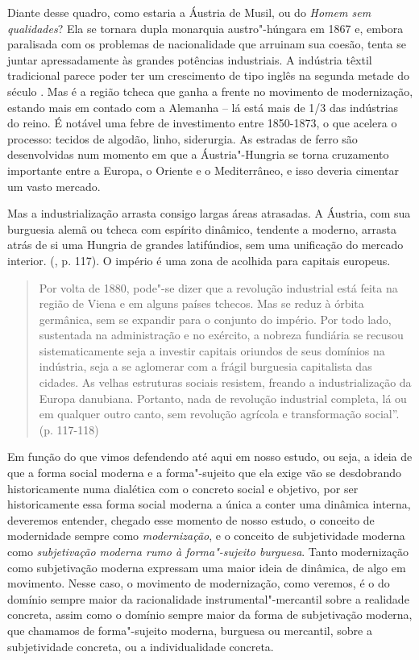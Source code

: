 Diante desse quadro, como estaria a Áustria de Musil, ou do \emph{Homem
sem qualidades}? Ela se tornara dupla monarquia austro"-húngara em 1867
e, embora paralisada com os problemas de nacionalidade que arruinam sua
coesão, tenta se juntar apressadamente às grandes potências industriais.
A indústria têxtil tradicional parece poder ter um crescimento de tipo
inglês na segunda metade do século . Mas é a região tcheca que ganha
a frente no movimento de modernização, estando mais em contado com a
Alemanha -- lá está mais de 1/3 das indústrias do reino. É notável uma
febre de investimento entre 1850-1873, o que acelera o processo: tecidos
de algodão, linho, siderurgia. As estradas de ferro são desenvolvidas
num momento em que a Áustria"-Hungria se torna cruzamento importante
entre a Europa, o Oriente e o Mediterrâneo, e isso deveria cimentar um
vasto mercado.

Mas a industrialização arrasta consigo largas áreas atrasadas. A
Áustria, com sua burguesia alemã ou tcheca com espírito dinâmico,
tendente a moderno, arrasta atrás de si uma Hungria de grandes
latifúndios, sem uma unificação do mercado interior. (, p. 117). O
império é uma zona de acolhida para capitais europeus.

\begin{quote}
Por volta de 1880, pode"-se dizer que a revolução industrial está feita
na região de Viena e em alguns países tchecos. Mas se reduz à órbita
germânica, sem se expandir para o conjunto do império. Por todo lado,
sustentada na administração e no exército, a nobreza fundiária se
recusou sistematicamente seja a investir capitais oriundos de seus
domínios na indústria, seja a se aglomerar com a frágil burguesia
capitalista das cidades. As velhas estruturas sociais resistem, freando
a industrialização da Europa danubiana. Portanto, nada de revolução
industrial completa, lá ou em qualquer outro canto, sem revolução
agrícola e transformação social''. (p. 117-118)
\end{quote}

Em função do que vimos defendendo até aqui em nosso estudo, ou seja, a
ideia de que a forma social moderna e a forma"-sujeito que ela exige vão
se desdobrando historicamente numa dialética com o concreto social e
objetivo, por ser historicamente essa forma social moderna a única a
conter uma dinâmica interna, deveremos entender, chegado esse momento de
nosso estudo, o conceito de modernidade sempre como \emph{modernização},
e o conceito de subjetividade moderna como \emph{subjetivação moderna
rumo à forma"-sujeito burguesa}. Tanto modernização como subjetivação
moderna expressam uma maior ideia de dinâmica, de algo em movimento.
Nesse caso, o movimento de modernização, como veremos, é o do domínio
sempre maior da racionalidade instrumental"-mercantil sobre a realidade
concreta, assim como o domínio sempre maior da forma de subjetivação
moderna, que chamamos de forma"-sujeito moderna, burguesa ou mercantil,
sobre a subjetividade concreta, ou a individualidade concreta.


